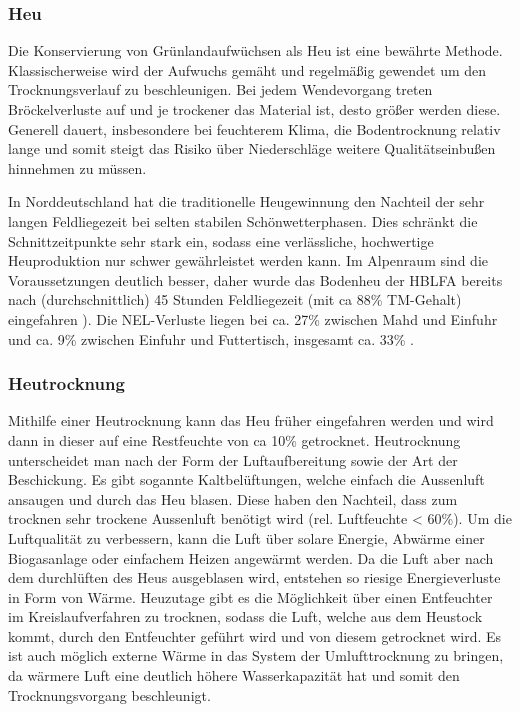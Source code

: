 \subsubsection{Heu}
\label{subsub:Heu}
Die Konservierung von Grünlandaufwüchsen als Heu ist eine bewährte Methode.
Klassischerweise wird der Aufwuchs gemäht und regelmäßig gewendet um den Trocknungsverlauf zu beschleunigen.
Bei jedem Wendevorgang treten Bröckelverluste auf und je trockener das Material ist, desto größer werden diese.
Generell dauert, insbesondere bei feuchterem Klima, die Bodentrocknung relativ lange und somit steigt das Risiko über Niederschläge weitere Qualitätseinbußen hinnehmen zu müssen.

In Norddeutschland hat die traditionelle Heugewinnung den Nachteil der sehr langen Feldliegezeit bei selten stabilen Schönwetterphasen.
Dies schränkt die Schnittzeitpunkte sehr stark ein, sodass eine verlässliche, hochwertige Heuproduktion nur schwer gewährleistet werden kann.
Im Alpenraum sind die Voraussetzungen deutlich besser, daher wurde das Bodenheu der \ac{HBLFA} bereits nach (durchschnittlich) 45 Stunden Feldliegezeit (mit ca 88\% \ac{TM}-Gehalt) eingefahren \parencite[63]{gruber2015einfluss}).
Die \ac{NEL}-Verluste liegen bei ca. 27\% zwischen Mahd und Einfuhr und ca. 9\% zwischen Einfuhr und Futtertisch, insgesamt ca. 33\% \parencite[30]{fritz2018wirtschaftliche}.

\subsubsection{Heutrocknung}
\label{subsub:Heutrocknung}
Mithilfe einer Heutrocknung kann das Heu früher eingefahren werden und wird dann in dieser auf eine Restfeuchte von ca 10\% getrocknet.
Heutrocknung unterscheidet man nach der Form der Luftaufbereitung sowie der Art der Beschickung.
Es gibt sogannte Kaltbelüftungen, welche einfach die Aussenluft ansaugen und durch das Heu blasen.
Diese haben den Nachteil, dass zum trocknen sehr trockene Aussenluft benötigt wird (rel. Luftfeuchte < 60\%).
Um die Luftqualität zu verbessern, kann die Luft über solare Energie, Abwärme einer Biogasanlage oder einfachem Heizen angewärmt werden.
Da die Luft aber nach dem durchlüften des Heus ausgeblasen wird, entstehen so riesige Energieverluste in Form von Wärme.
Heuzutage gibt es die Möglichkeit über einen Entfeuchter im Kreislaufverfahren zu trocknen, sodass die Luft, welche aus dem Heustock kommt, durch den Entfeuchter geführt wird und von diesem getrocknet wird.
Es ist auch möglich externe Wärme in das System der Umlufttrocknung zu bringen, da wärmere Luft eine deutlich höhere Wasserkapazität hat und somit den Trocknungsvorgang beschleunigt.

